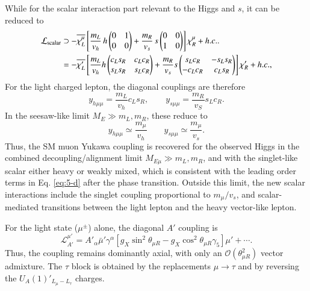 \documentclass[onecolumn, aps, nofootinbib, prd, preprint, floats, floatfix, amsmath, amssymb, superscriptaddress, preprintnumbers]{revtex4-1}
\begin{document}
While for the scalar interaction part relevant to the Higgs and $s$, it can be reduced to
\begin{equation}
\begin{aligned}
\mathcal{L}_{\rm scalar} &
\supset-\overline{\chi_L^\mu}
\left[
\frac{m_L}{v_h}\,h
\begin{pmatrix}
0&1\\
0&0
\end{pmatrix}
+
\frac{m_R}{v_s}\,s
\begin{pmatrix}
0&0\\
1&0
\end{pmatrix}
\right]\chi_R^\mu
+h.c. .\\
&=-\overline{\chi'_L}
\left[\frac{m_L}{v_h} h \begin{pmatrix}
c_Ls_R&c_Lc_R\\
s_Ls_R&s_Lc_R
\end{pmatrix}+ \frac{m_R}{v_s} s \begin{pmatrix}
s_Lc_R&-s_Ls_R\\
-c_Lc_R&c_Ls_R
\end{pmatrix}\right]\chi'_R+h.c.,
\label{eq:gauge-basis-scalar-yukawa}
\end{aligned}
\end{equation}
For the light charged lepton, the diagonal couplings are therefore
\begin{equation}
y_{h\mu\mu}=
\frac{m_L}{v_h}c_Ls_R,
\qquad
y_{s\mu\mu}=\frac{m_R}{v_S}s_Lc_R .
\label{eq:light-scalar-yukawa}
\end{equation}
In the seesaw-like limit $M_E\gg m_L,m_R$, these reduce to
\begin{equation}
y_{h\mu\mu}\simeq
\frac{m_\mu}{v_h}
\qquad
y_{s\mu\mu}\simeq \frac{m_\mu}{v_s}.
\label{eq:sm-limit-scalar-yukawa}
\end{equation}
Thus, the SM muon Yukawa coupling is recovered for the observed Higgs in the combined decoupling/alignment limit $M_{E\mu}\gg m_L,m_R$, and with the singlet-like scalar either heavy or weakly mixed, which is consistent with the leading order terms in Eq. \eqref{eq:5-d} after the phase transition. Outside this limit, the new scalar interactions include the singlet coupling proportional to $m_\mu/v_s$, and scalar-mediated transitions between the light lepton and the heavy vector-like lepton.

For the light state ($\mu^\pm$) alone, the diagonal $A'$ coupling is
\begin{equation}
\mathcal{L}_{A'}^{\mu'}
=
A'_\alpha\bar\mu'\gamma^\alpha
\left[
g_X\sin^2\theta_{\mu R}
-g_X\cos^2\theta_{\mu R} \gamma_5
\right]\mu'
+\cdots .
\label{eq:light-muon-Apr}
\end{equation}
Thus, the coupling remains dominantly axial, with only an $\mathcal{O}(\theta_{\mu R}^2)$ vector admixture. The $\tau$ block is obtained by the replacements $\mu\to\tau$ and by reversing the $U_A(1)'_{L_\mu-L_\tau}$ charges.
\end{document}
